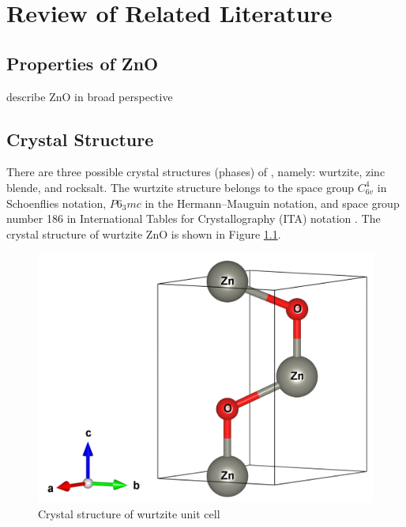 \chapter{Review of Related Literature}
\section{Properties of ZnO}
    describe ZnO in broad perspective
\section{Crystal Structure}
There are three possible crystal structures (phases) of , namely: wurtzite, zinc blende, and rocksalt. The wurtzite structure belongs to the space group $C^4_{6v}$ in Schoenflies notation, $P6_3mc$ in the  Hermann–Mauguin notation, and space group number 186 in International Tables for Crystallography (ITA) notation \citep{Hahn2005}. The crystal structure of wurtzite ZnO is shown in Figure \ref{fig:ZnO_unit}.

\begin{figure}[tbh!] 
	\centering
	\includegraphics[width=0.5\linewidth]{"images/rrl/ZnO_unit"}
	\caption[Crystal structure of wurtzite  unit cell]{Crystal structure of wurtzite  unit cell}
	\label{fig:ZnO_unit}
\end{figure}

